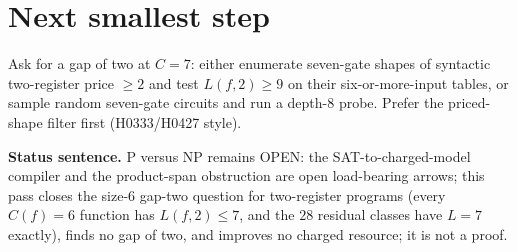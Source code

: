 \documentclass[11pt]{article}
\begin{document}
\section*{Next smallest step}
Ask for a gap of two at $C=7$: either enumerate seven-gate shapes of syntactic two-register price $\ge2$ and test $L(f,2)\ge9$ on their six-or-more-input tables, or sample random seven-gate circuits and run a depth-$8$ probe. Prefer the priced-shape filter first (H0333/H0427 style).

\bigskip
\noindent\textbf{Status sentence.} P versus NP remains OPEN: the SAT-to-charged-model compiler and the product-span obstruction are open load-bearing arrows; this pass closes the size-$6$ gap-two question for two-register programs (every $C(f)=6$ function has $L(f,2)\le7$, and the $28$ residual classes have $L=7$ exactly), finds no gap of two, and improves no charged resource; it is not a proof.
\end{document}
